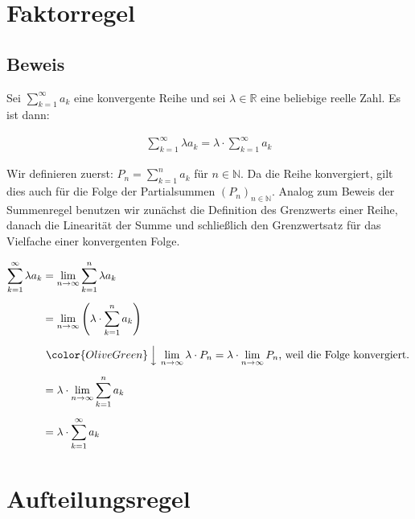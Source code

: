 \documentclass[fontsize=9pt,
               parskip=half-,
               DIV=14,
               listof=chapterentry,
               tocflat]{scrbook}
\begin{document}
\section{Faktorregel}

\subsection{Beweis}

\begin{theorem*}
Sei $\sum _{k=1}^{\infty }a_{k}$ eine konvergente Reihe und sei $\lambda \in \mathbb {R} $ eine beliebige reelle Zahl. Es ist dann:

\begin{align*}
\sum _{k=1}^{\infty }\lambda a_{k}=\lambda \cdot \sum _{k=1}^{\infty }a_{k}
\end{align*}

\end{theorem*}

\begin{proof*}
Wir definieren zuerst: $P_{n}=\sum _{k=1}^{n}a_{k}$ für $n\in \mathbb {N} $. Da die Reihe konvergiert, gilt dies auch für die Folge der Partialsummen $(P_{n})_{n\in \mathbb {N} }$. Analog zum Beweis der Summenregel benutzen wir zunächst die Definition des Grenzwerts einer Reihe, danach die Linearität der Summe und schließlich den Grenzwertsatz für das Vielfache einer konvergenten Folge.

\begin{align*}
\sum _{k=1}^{\infty }\lambda a_{k}&=\lim _{n\to \infty }\sum _{k=1}^{n}\lambda a_{k}\\[0.5em]&=\lim _{n\to \infty }\left(\lambda \cdot \sum _{k=1}^{n}a_{k}\right)\\[0.5em]&\ {\color {OliveGreen}\left\downarrow \ \lim _{n\to \infty }\lambda \cdot P_{n}=\lambda \cdot \lim _{n\to \infty }P_{n}{\text{, weil die Folge konvergiert.}}\right.}\\[0.5em]&=\lambda \cdot \lim _{n\to \infty }\sum _{k=1}^{n}a_{k}\\[0.5em]&=\lambda \cdot \sum _{k=1}^{\infty }a_{k}
\end{align*}

\end{proof*}

\section{Aufteilungsregel}
\end{document}

